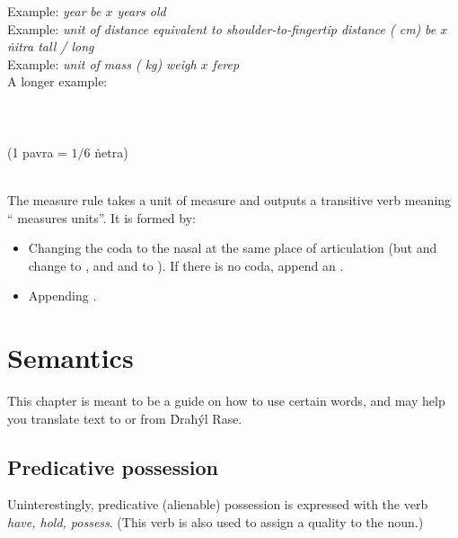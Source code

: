 \documentclass{book}
\begin{document}
Example:  \emph{year} \ra{}  \emph{be $x$ years old} \\
Example:  \emph{unit of distance equivalent to shoulder-to-fingertip distance ( cm)} \ra{}  \emph{be $x$ ṅitra tall / long} \\
Example:  \emph{unit of mass ( kg)} \ra{}  \emph{weigh $x$ ferep} \\
A longer example: \\
~\\
  \\
  \\
\emph{  } (1 pavra = $1/6$ ṅetra) \\
~

The measure rule takes a unit of measure and outputs a transitive verb meaning `` measures  units''. It is formed by:

\begin{itemize}
    \item Changing the coda to the nasal at the same place of articulation (but  and  change to , and  and  to ). If there is no coda, append an .
    \item Appending .
\end{itemize}

\chapter{Semantics}

This chapter is meant to be a guide on how to use certain words, and may help you translate text to or from Ḋraħýl Rase.

\section{Predicative possession}

Uninterestingly, predicative (alienable) possession is expressed with the verb  \emph{have, hold, possess}. (This verb is also used to assign a quality to the noun.) \\
~\\
   \\
   \\
\emph{  } \\
~
\end{document}
